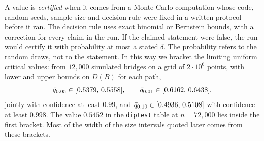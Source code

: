 A value is \emph{certified} when it comes from a Monte Carlo computation whose code, random seeds, sample size and decision rule were fixed in a written protocol before it ran. The decision rule uses exact binomial or Bernstein bounds, with a correction for every claim in the run. If the claimed statement were false, the run would certify it with probability at most a stated $\delta$. The probability refers to the random draws, not to the statement. In this way we bracket the limiting uniform critical values: from $12{,}000$ simulated bridges on a grid of $2\cdot10^6$ points, with lower and upper bounds on $D(B)$ for each path,
\[
\bar q_{0.05}\in[0.5379,\,0.5558],\qquad \bar q_{0.01}\in[0.6162,\,0.6438],
\]
jointly with confidence at least $0.99$, and $\bar q_{0.10}\in[0.4936,\,0.5108]$ with confidence at least $0.998$. The value $0.5452$ in the \texttt{diptest} table at $n=72{,}000$ lies inside the first bracket. Most of the width of the size intervals quoted later comes from these brackets.

